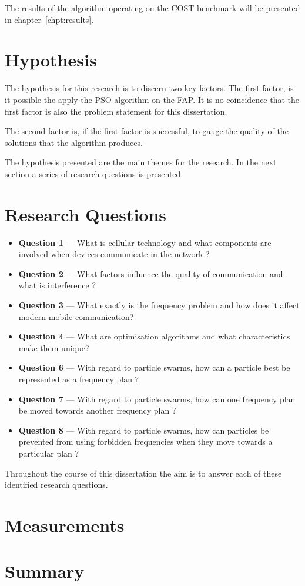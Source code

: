 The results of the algorithm operating on the \gls{COST} benchmark will be presented in chapter~\ref{chpt:results}. 
\section{Hypothesis}
The hypothesis for this research is to discern two key factors. The first factor, is it possible the apply the \gls{PSO} algorithm on the \gls{FAP}. It is no coincidence that the first factor is also the problem statement for this dissertation.

The second factor is, if the first factor is successful, to gauge the quality of the solutions that the algorithm produces.

The hypothesis presented are the main themes for the research. In the next section a series of research questions is presented.
\section{Research Questions}
\begin{itemize}
\item \textbf{Question 1} --- What is cellular technology and what components are involved when devices communicate in the network ?
\item \textbf{Question 2} --- What factors influence the quality of communication and what is interference ?
\item \textbf{Question 3} --- What exactly is the frequency problem and how does it affect modern mobile communication?
\item \textbf{Question 4} --- What are optimisation algorithms and what characteristics make them unique?
\item \textbf{Question 6} --- With regard to particle swarms, how can a particle best be represented as a frequency plan ?
\item \textbf{Question 7} --- With regard to particle swarms, how can one frequency plan be moved towards another frequency plan ?
\item \textbf{Question 8} --- With regard to particle swarms, how can particles be prevented from using forbidden frequencies when they move towards a particular plan ?
\end{itemize}

Throughout the course of this dissertation the aim is to answer each of these identified research questions. 

\section{Measurements}
\section{Summary}

